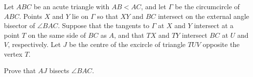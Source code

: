 Let $ABC$ be an acute triangle with $AB < AC$, and let $\Gamma$ be the circumcircle of $ABC$. Points $X$ and $Y$ lie on $\Gamma$ so that $XY$ and $BC$ intersect on the external angle bisector of $\angle BAC$. Suppose that the tangents to $\Gamma$ at $X$ and $Y$ intersect at a point $T$ on the same side of $BC$ as $A$, and that $TX$ and $TY$ intersect $BC$ at $U$ and $V$, respectively. Let $J$ be the centre of the excircle of triangle $TUV$ opposite the vertex $T$.

Prove that $AJ$ bisects $\angle BAC$.
